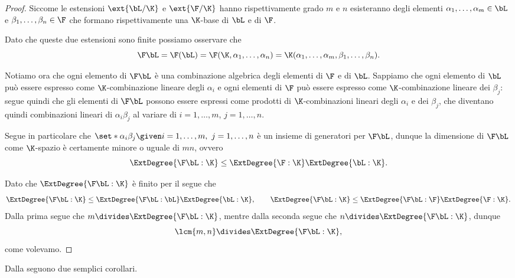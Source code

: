 \begin{proof}
    Siccome le estensioni $\ext{\bL / \K}$ e $\ext{\F / \K}$ hanno rispettivamente grado $m$ e $n$ esisteranno degli elementi $\alpha_1, \dots, \alpha_m \in \bL$ e $\beta_1, \dots, \beta_n \in \F$ che formano rispettivamente una $\K$-base di $\bL$ e di $\F$.
    
    Dato che queste due estensioni sono finite possiamo osservare che \[
        \F\bL = \F(\bL) = \F(\K, \alpha_1, \dots, \alpha_n) = \K(\alpha_1, \dots, \alpha_m, \beta_1, \dots, \beta_n).
    \]

    Notiamo ora che ogni elemento di $\F\bL$ è una combinazione algebrica degli elementi di $\F$ e di $\bL$. Sappiamo che ogni elemento di $\bL$ può essere espresso come $\K$-combinazione lineare degli $\alpha_i$ e ogni elementi di $\F$ può essere espresso come $\K$-combinazione lineare dei $\beta_j$: segue quindi che gli elementi di $\F\bL$ possono essere espressi come prodotti di $\K$-combinazioni lineari degli $\alpha_i$ e dei $\beta_j$, che diventano quindi combinazioni lineari di $\alpha_i\beta_j$ al variare di $i = 1, \dots, m$, $j = 1, \dots, n$.
    
    Segue in particolare che $\set*{\alpha_i\beta_j \given i = 1, \dots, m,\ j = 1, \dots, n}$ è un insieme di generatori per $\F\bL$, dunque la dimensione di $\F\bL$ come $\K$-spazio è certamente minore o uguale di $mn$, ovvero \[
        \ExtDegree{\F\bL : \K} \leq \ExtDegree{\F : \K}\ExtDegree{\bL : \K}.
    \] 

    Dato che $\ExtDegree{\F\bL : \K}$ è finito per il  segue che \[
        \ExtDegree{\F\bL : \K} \leq \ExtDegree{\F\bL : \bL}\ExtDegree{\bL : \K}, \qquad
        \ExtDegree{\F\bL : \K} \leq \ExtDegree{\F\bL : \F}\ExtDegree{\F : \K}.
    \] Dalla prima segue che $m \divides \ExtDegree{\F\bL : \K}$, mentre dalla seconda segue che $n \divides \ExtDegree{\F\bL : \K}$, dunque \[
        \lcm{m, n} \divides \ExtDegree{\F\bL : \K}, 
    \] come volevamo.
\end{proof}

Dalla  seguono due semplici corollari.

